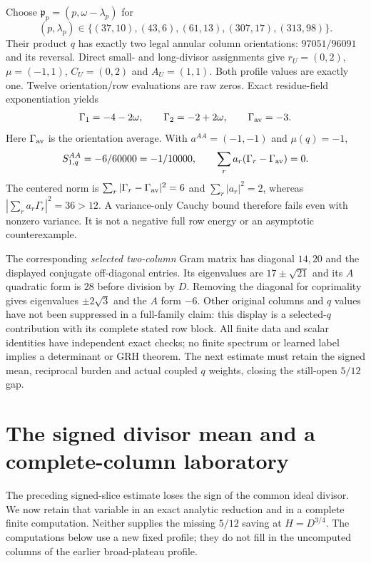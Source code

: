 \documentclass[11pt]{article}
\theoremstyle{definition}\newtheorem{definition}[theorem]{Definition}
\theoremstyle{remark}\newtheorem{remark}[theorem]{Remark}
\begin{document}
Choose $\mathfrak p_p=(p,\omega-\lambda_p)$ for
\[
 (p,\lambda_p)\in\{(37,10),(43,6),(61,13),(307,17),(313,98)\}.
\]
Their product $q$ has exactly two legal annular column orientations:
$97051/96091$ and its reversal. Direct small- and long-divisor assignments
give $r_U=(0,2)$, $\mu=(-1,1)$, $C_U=(0,2)$ and $A_U=(1,1)$.
Both profile values are exactly one. Twelve orientation/row evaluations
are raw zeros. Exact residue-field exponentiation yields
\[
 \Gamma_1=-4-2\omega,\qquad \Gamma_2=-2+2\omega,
 \qquad \Gamma_{\rm av}=-3.
\]
Here $\Gamma_{\rm av}$ is the orientation average.
With $a^{AA}=(-1,-1)$ and $\mu(q)=-1$,
\[
 S_{1,q}^{AA}=-6/60000=-1/10000,\qquad
 \sum_r a_r(\Gamma_r-\Gamma_{\rm av})=0.
\]
The centered norm is
$\sum_r|\Gamma_r-\Gamma_{\rm av}|^2=6$ and $\sum_r|a_r|^2=2$,
whereas $|\sum_ra_r\Gamma_r|^2=36>12$.
A variance-only Cauchy bound therefore fails even with nonzero variance.
It is not a negative full row energy or an asymptotic counterexample.

The corresponding \emph{selected two-column} Gram matrix has diagonal
$14,20$ and the displayed conjugate off-diagonal entries. Its eigenvalues
are $17\pm\sqrt{21}$ and its $A$ quadratic form is $28$ before division
by $D$. Removing the diagonal for coprimality gives eigenvalues
$\pm2\sqrt3$ and the $A$ form $-6$. Other original columns and $q$ values
have not been suppressed in a full-family claim: this display is a
selected-$q$ contribution with its complete stated row block.
All finite data and scalar identities have independent exact checks;
no finite spectrum or learned label implies a determinant or GRH theorem.
The next estimate must retain the signed mean, reciprocal burden and
actual coupled $q$ weights, closing the still-open $5/12$ gap.

\section{The signed divisor mean and a complete-column laboratory}\label{sd:core}
The preceding signed-slice estimate loses the sign of the common ideal
 divisor. We now retain that variable in an exact analytic reduction and
in a complete finite computation. Neither supplies the missing
$5/12$ saving at $H=D^{3/4}$. The computations below use a new fixed
profile; they do not fill in the uncomputed columns of the earlier
broad-plateau profile.
\end{document}
